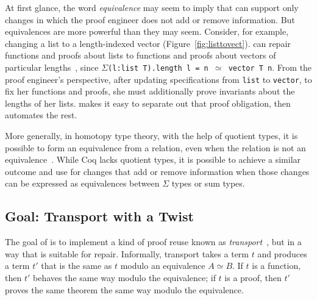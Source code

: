 At first glance, the word \textit{equivalence} may seem to imply that \toolnamec can support only changes in
which the proof engineer does not add or remove information.
But equivalences are more powerful than they may seem.
Consider, for example, changing a list to a length-indexed vector (Figure~\ref{fig:listtovect}).
\toolnamec can repair functions and proofs about lists to functions and proofs about vectors of particular lengths~\href{https://github.com/uwplse/pumpkin-pi/blob/v2.0.0/plugin/coq/examples/Example.v}{}, %
since $\Sigma$\lstinline{(l:list T).length l = n }$\simeq$\lstinline{ vector T n}.
From the proof engineer's perspective, after updating specifications from \lstinline{list} to \lstinline{vector},
to fix her functions and proofs, she must additionally prove invariants about the lengths of her lists.
\toolnamec makes it easy to separate out that proof obligation, then automates the rest.

More generally, in homotopy type theory, with the help of quotient types, it is possible to form an equivalence
from a relation, even when the relation is not an equivalence~\cite{angiuli2020internalizing}.
While Coq lacks quotient types,
it is possible to achieve a similar outcome and use \toolnamec for changes that add or remove information
when those changes can be expressed as equivalences between $\Sigma$ types or sum types.

\subsection{Goal: Transport with a Twist}
\label{sec:repair}

The goal of \toolnamec is to implement a kind of proof reuse known as \textit{transport}~\cite{univalent2013homotopy},
but in a way that is suitable for repair.
Informally, transport takes a term $t$ and produces a term $t'$ that is the same as $t$ modulo an equivalence $A \simeq B$.
If $t$ is a function, then $t'$ behaves the same way modulo the equivalence;
if $t$ is a proof, then $t'$ proves the same theorem the same way modulo the equivalence.

